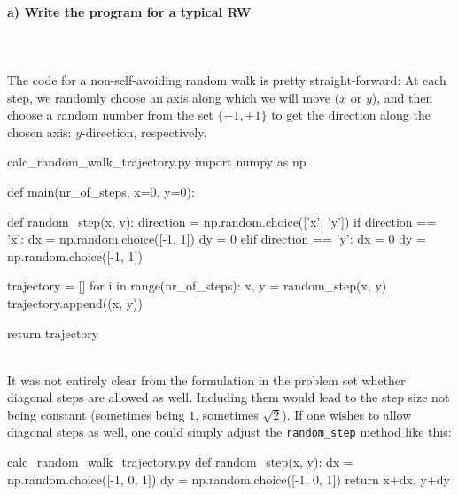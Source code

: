 \paragraph{a) Write the program for a typical RW} \ \\
\\
    The code for a non-self-avoiding random walk is pretty 
    straight-forward: At each step, we randomly choose an axis along
    which we will move ($x$ or $y$), and then choose a random 
    number from the set $\{-1, +1\}$ to get the direction along the 
    chosen axis:
    $y$-direction, respectively. \\
    \begin{code}{calc\_random\_walk\_trajectory.py}
        import numpy as np
        
        
        def main(nr_of_steps, x=0, y=0):
        
            def random_step(x, y):
                direction = np.random.choice(['x', 'y'])
                if direction == 'x':
                    dx = np.random.choice([-1, 1])
                    dy = 0
                elif direction == 'y':
                    dx = 0
                    dy = np.random.choice([-1, 1])
        
            trajectory = []
            for i in range(nr_of_steps):
                x, y = random_step(x, y) 
                trajectory.append((x, y))
        
            return trajectory\end{code} \ \\
    \noindent
    It was not entirely clear from the formulation in the problem set 
    whether diagonal steps are allowed as well. 
    Including them would lead to the step size not being constant 
    (sometimes being $1$, sometimes $\sqrt{2}$). If one wishes to 
    allow diagonal steps as well, one could simply adjust the 
    \lstinline{random_step} method like this: \\
    \begin{code}{calc\_random\_walk\_trajectory.py}
        def random_step(x, y):
            dx = np.random.choice([-1, 0, 1])
            dy = np.random.choice([-1, 0, 1])
            return x+dx, y+dy\end{code}

\newpage
